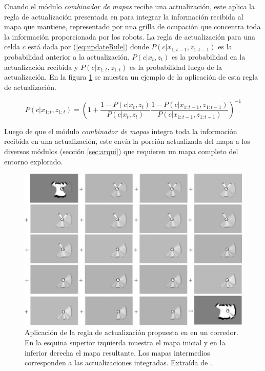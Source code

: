 Cuando el módulo \emph{combinador de mapas} recibe una actualización, este
aplica la regla de actualización presentada en \cite{stachniss2009robotic} para
integrar la información recibida al mapa que mantiene, representado por una
grilla de ocupación que concentra toda la información proporcionada por los
robots. La regla de actualización para una celda $c$ está dada por
(\ref{eq:updateRule}) donde $P(c|x_{1:t-1},z_{1:t-1})$ es la probabilidad
anterior a la actualización, $P(c | x_t,z_t)$ es la probabilidad en la
actualización recibida y  $P(c|x_{1:t},z_{1:t})$ es la probabilidad luego de la
actualización. En la figura \ref{fig:mappingUpRule} se muestra un ejemplo de la
aplicación de esta regla de actualización. 

\begin{equation}
  P(c|x_{1:t},z_{1:t}) =\left( 1 + \frac{1 - P(c | x_t,z_t)}{P(c|x_t,z_t)} \frac{1 - P(c|x_{1:t-1},z_{1:t-1})}{P(c|x_{1:t-1},z_{1:t-1})} \right)^{-1}
\label{eq:updateRule}
\end{equation}


Luego de que el módulo \emph{combinador de mapas} integra toda la información
recibida en una actualización, este envía la porción actualizada del mapa a los
diversos módulos (sección \ref{sec:arqui}) que requieren un mapa
completo del entorno explorado.

\begin{figure}[H]
  \center
  \includegraphics[width=1.00\linewidth]{imagenes/occgridUpdate.png}
  \caption[Aplicación de la regla de actualización propuesta en
  \cite{stachniss2009robotic} en un corredor.]{Aplicación de la
    regla de actualización propuesta en \cite{stachniss2009robotic} en un
    corredor. En la esquina superior izquierda muestra el mapa inicial y
    en la inferior derecha el mapa resultante. Los mapas intermedios corresponden a las actualizaciones integradas. Extraída de
  \cite{stachniss2009robotic}. }
  \label{fig:mappingUpRule}
\end{figure} 



